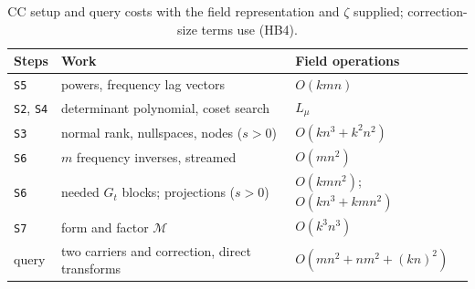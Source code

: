 \begin{table}[p]
\centering
\small
\begin{tabular}{@{}lll@{}}
\hline
Steps & Work & Field operations \\
\hline
\texttt{S5} & powers, frequency lag vectors & $O(kmn)$\\
\texttt{S2}, \texttt{S4} & determinant polynomial, coset search & $L_\mu$\\
\texttt{S3} & normal rank, nullspaces, nodes ($s>0$) & $O(kn^3+k^2n^2)$\\
\texttt{S6} & $m$ frequency inverses, streamed & $O(mn^2)$\\
\texttt{S6} & needed $G_t$ blocks; projections ($s>0$) & $O(kmn^2)$; $O(kn^3+kmn^2)$\\
\texttt{S7} & form and factor $\mathcal M$ & $O(k^3n^3)$\\
query & two carriers and correction, direct transforms & $O(mn^2+nm^2+(kn)^2)$\\
\hline
\end{tabular}
\caption{CC setup and query costs with the field representation and
$\zeta$ supplied; correction-size terms use (HB4).}

\end{table}

